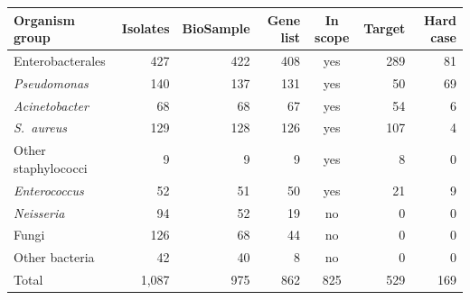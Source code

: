\begin{tabular}{@{}lrrrcrr@{}}
\toprule
Organism group & Isolates & BioSample & Gene list & In scope & Target & Hard case \\
\midrule
Enterobacterales & 427 & 422 & 408 & yes & 289 & 81 \\
\textit{Pseudomonas} & 140 & 137 & 131 & yes & 50 & 69 \\
\textit{Acinetobacter} & 68 & 68 & 67 & yes & 54 & 6 \\
\textit{S.~aureus} & 129 & 128 & 126 & yes & 107 & 4 \\
Other staphylococci & 9 & 9 & 9 & yes & 8 & 0 \\
\textit{Enterococcus} & 52 & 51 & 50 & yes & 21 & 9 \\
\textit{Neisseria} & 94 & 52 & 19 & no & 0 & 0 \\
Fungi & 126 & 68 & 44 & no & 0 & 0 \\
Other bacteria & 42 & 40 & 8 & no & 0 & 0 \\
\midrule
Total & 1,087 & 975 & 862 & 825 & 529 & 169 \\
\bottomrule
\end{tabular}
